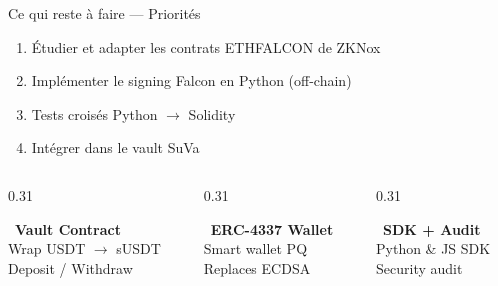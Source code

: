 \documentclass[aspectratio=169, 12pt]{beamer}
\begin{document}
\begin{frame}[shrink=15]{Ce qui reste à faire --- Priorités}

  \begin{tcolorbox}[colback=danger_red!8, colframe=danger_red,
    title={\bfseries\color{white} \faExclamationTriangle\ Priorité \#1 : Intégration Falcon (ETHFALCON)},
    fonttitle=\color{white}, top=3pt, bottom=3pt]
    \small
    \begin{enumerate}\setlength\itemsep{1pt}
      \item Étudier et adapter les contrats ETHFALCON de ZKNox
      \item Implémenter le signing Falcon en Python (off-chain)
      \item Tests croisés Python $\to$ Solidity
      \item Intégrer dans le vault SuVa
    \end{enumerate}
  \end{tcolorbox}

  \vspace{0.15cm}

  \begin{columns}[T]
    \begin{column}{0.31\textwidth}
      \begin{tcolorbox}[colback=warn_bg, colframe=warn_orange,
        title={\bfseries\small Priorité \#2}, top=2pt, bottom=2pt]
        {\small \faLock\ \textbf{Vault Contract}\\
        Wrap USDT $\to$ sUSDT\\
        Deposit / Withdraw}
      \end{tcolorbox}
    \end{column}
    \begin{column}{0.31\textwidth}
      \begin{tcolorbox}[colback=warn_bg, colframe=warn_orange,
        title={\bfseries\small Priorité \#2}, top=2pt, bottom=2pt]
        {\small \faWallet\ \textbf{ERC-4337 Wallet}\\
        Smart wallet PQ\\
        Replaces ECDSA}
      \end{tcolorbox}
    \end{column}
    \begin{column}{0.31\textwidth}
      \begin{tcolorbox}[colback=gray!10, colframe=gray!50,
        title={\bfseries\small Priorité \#3}, top=2pt, bottom=2pt]
        {\small \faCode\ \textbf{SDK + Audit}\\
        Python \& JS SDK\\
        Security audit}
      \end{tcolorbox}
    \end{column}
  \end{columns}


\end{frame}
\end{document}
